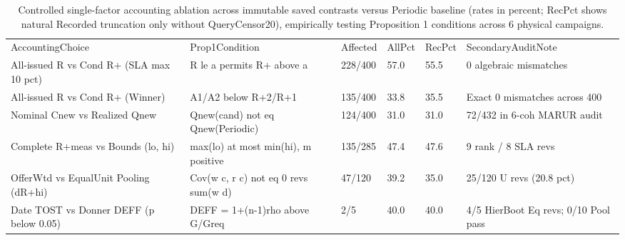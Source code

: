 \begin{table}[!ht]
\centering\footnotesize\setlength{\tabcolsep}{3.5pt}
\caption{Controlled single-factor accounting ablation across immutable saved contrasts versus Periodic baseline (rates in percent; RecPct shows natural Recorded truncation only without QueryCensor20), empirically testing Proposition 1 conditions across 6 physical campaigns.}
\begin{tabular}{llllll}
\hline
AccountingChoice & Prop1Condition & Affected & AllPct & RecPct & SecondaryAuditNote \\
All-issued R vs Cond R+ (SLA max 10 pct) & R le a permits R+ above a & 228/400 & 57.0 & 55.5 & 0 algebraic mismatches \\
All-issued R vs Cond R+ (Winner) & A1/A2 below R+2/R+1 & 135/400 & 33.8 & 35.5 & Exact 0 mismatches across 400 \\
Nominal Cnew vs Realized Qnew & Qnew(cand) not eq Qnew(Periodic) & 124/400 & 31.0 & 31.0 & 72/432 in 6-coh MARUR audit \\
Complete R+meas vs Bounds (lo, hi) & max(lo) at most min(hi), m positive & 135/285 & 47.4 & 47.6 & 9 rank / 8 SLA revs \\
OfferWtd vs EqualUnit Pooling (dR+hi) & Cov(w c, r c) not eq 0 revs sum(w d) & 47/120 & 39.2 & 35.0 & 25/120 U revs (20.8 pct) \\
Date TOST vs Donner DEFF (p below 0.05) & DEFF = 1+(n-1)rho above G/Greq & 2/5 & 40.0 & 40.0 & 4/5 HierBoot Eq revs; 0/10 Pool pass \\
\hline
\end{tabular}
\end{table}
